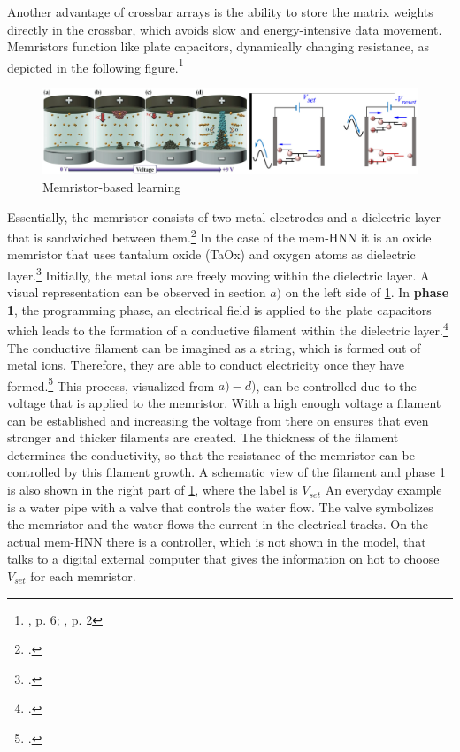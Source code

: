 Another advantage of crossbar arrays is the ability to store the matrix weights directly in the crossbar, which avoids slow and energy-intensive data movement. 
Memristors function like plate capacitors, dynamically changing resistance, as depicted in the following figure.\footnote{\cite{changDirectObservationDualFilament2017}, p. 6; \cite{sungPerspectiveReviewMemristive2018}, p. 2}
\begin{figure}[H]
    \centering
    \includegraphics[width=0.9\linewidth]{graphics/Memristor_filoments.png}
    \caption{Memristor-based learning}
    \label{platecondensator}
\end{figure}
Essentially, the memristor consists of two metal electrodes and a dielectric layer that is sandwiched between them.\footcite[cf.][1]{changDirectObservationDualFilament2017}
In the case of the \ac{mem-HNN} it is an oxide memristor that uses tantalum oxide (TaOx) and oxygen atoms as dielectric layer.\footcite[cf.][412]{caiPowerefficientCombinatorialOptimization2020}
Initially, the metal ions are freely moving within the dielectric layer. 
A visual representation can be observed in section \(a)\) on the left side of \ref{platecondensator}.
In \textbf{phase 1}, the programming phase, an electrical field is applied to the plate capacitors which leads to the formation of a conductive filament within the dielectric layer.\footcite[cf.][3]{changDirectObservationDualFilament2017}
The conductive filament can be imagined as a string, which is formed out of metal ions.
Therefore, they are able to conduct electricity once they have formed.\footcite[cf.][5]{changDirectObservationDualFilament2017}
This process, visualized from \(a)-d)\), can be controlled due to the voltage that is applied to the memristor.
With a high enough voltage a filament can be established and increasing the voltage from there on ensures that even stronger and thicker filaments are created.
The thickness of the filament determines the conductivity, so that the resistance of the memristor can be controlled by this filament growth.
A schematic view of the filament and phase 1 is also shown in the right part of \ref{platecondensator}, where the label is \(V_{set}\) 
An everyday example is a water pipe with a valve that controls the water flow. 
The valve symbolizes the memristor and the water flows the current in the electrical tracks.
On the actual \ac{mem-HNN} there is a controller, which is not shown in the model, that talks to a digital external computer that gives the information on hot to choose \(V_{set}\) for each memristor.

